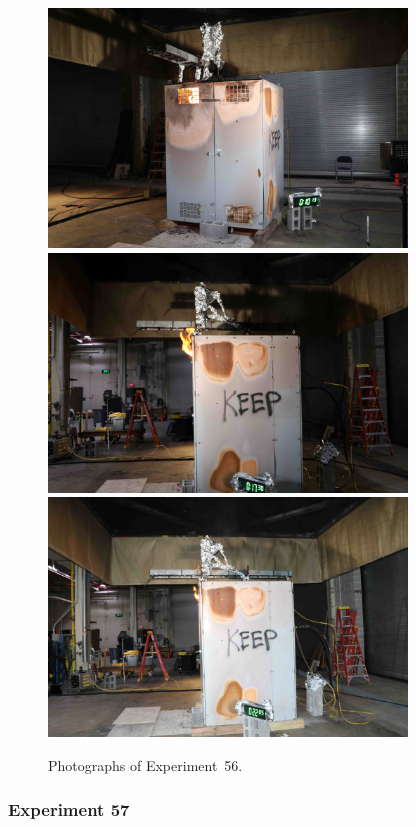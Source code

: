 \begin{figure}[p]
\centering
\includegraphics[height=2.50in]{../FIGURES/Test_56_10_min_13_s} \\
\includegraphics[height=2.50in]{../FIGURES/Test_56_17_min_30_s} \\
\includegraphics[height=2.50in]{../FIGURES/Test_56_22_min_5_s}
\caption[Photographs of Experiment~56]{Photographs of Experiment~56.}
\label{fig:Test_56_photos}
\end{figure}


\clearpage

\subsubsection{Experiment 57}

